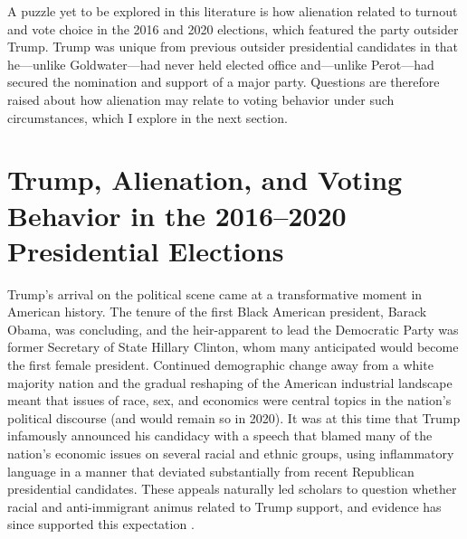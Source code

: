\documentclass[12pt]{article}
\begin{document}
A puzzle yet to be explored in this literature is how alienation related to turnout and vote choice in the 2016 and 2020 elections, which featured the party outsider Trump. Trump was unique from previous outsider presidential candidates in that he---unlike Goldwater---had never held elected office and---unlike Perot---had secured the nomination and support of a major party. Questions are therefore raised about how alienation may relate to voting behavior under such circumstances, which I explore in the next section. 










\section*{Trump, Alienation, and Voting Behavior in the 2016--2020 Presidential Elections}\label{sec:theory}
Trump's arrival on the political scene came at a transformative moment in American history. The tenure of the first Black American president, Barack Obama, was concluding, and the heir-apparent to lead the Democratic Party was former Secretary of State Hillary Clinton, whom many anticipated would become the first female president. Continued demographic change away from a white majority nation and the gradual reshaping of the American industrial landscape meant that issues of race, sex, and economics were central topics in the nation's political discourse (and would remain so in 2020). It was at this time that Trump infamously announced his candidacy with a speech that blamed many of the nation's economic issues on several racial and ethnic groups, using inflammatory language in a manner that deviated substantially from recent Republican presidential candidates. These appeals naturally led scholars to question whether racial and anti-immigrant animus related to Trump support, and evidence has since supported this expectation \parencite{hooghe2018explaining,mutz2018status,hopkins2021activation,mason2021activating}. 
\end{document}
